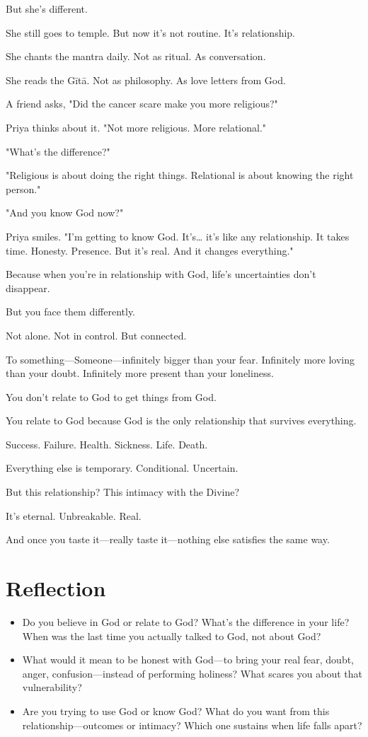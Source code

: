\documentclass[11pt,twoside]{book}
\begin{document}
But she's different.

She still goes to temple. But now it's not routine. It's relationship.

She chants the mantra daily. Not as ritual. As conversation.

She reads the Gītā. Not as philosophy. As love letters from God.

A friend asks, "Did the cancer scare make you more religious?"

Priya thinks about it. "Not more religious. More relational."

"What's the difference?"

"Religious is about doing the right things. Relational is about knowing the right person."

"And you know God now?"

Priya smiles. "I'm getting to know God. It's\ldots{} it's like any relationship. It takes time. Honesty. Presence. But it's real. And it changes everything."

Because when you're in relationship with God, life's uncertainties don't disappear.

But you face them differently.

Not alone. Not in control. But connected.

To something—Someone—infinitely bigger than your fear. Infinitely more loving than your doubt. Infinitely more present than your loneliness.

You don't relate to God to get things from God.

You relate to God because God is the only relationship that survives everything.

Success. Failure. Health. Sickness. Life. Death.

Everything else is temporary. Conditional. Uncertain.

But this relationship? This intimacy with the Divine?

It's eternal. Unbreakable. Real.

And once you taste it—really taste it—nothing else satisfies the same way.

\section*{Reflection}

\begin{itemize}
\item Do you believe in God or relate to God? What's the difference in your life? When was the last time you actually talked to God, not about God?
\item What would it mean to be honest with God—to bring your real fear, doubt, anger, confusion—instead of performing holiness? What scares you about that vulnerability?
\item Are you trying to use God or know God? What do you want from this relationship—outcomes or intimacy? Which one sustains when life falls apart?
\end{itemize}
\end{document}

